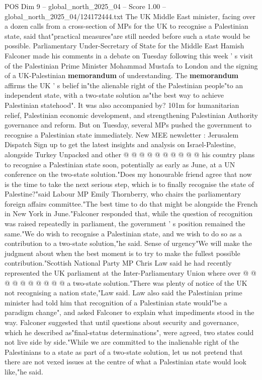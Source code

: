 \begin{textsample}{POS Dim 9 – global\_north\_2025\_04 – Score 1.00 – global\_north\_2025\_04/124172444.txt}  \label{ex:f9_pos_319}
The UK Middle East minister, facing over a dozen calls from a cross-section of MPs for the UK to recognise a Palestinian state, said that"practical measures"are still needed before such a state would be possible.
Parliamentary Under-Secretary of State for the Middle East Hamish Falconer made his comments in a debate on Tuesday following this week ' s visit of the Palestinian Prime Minister Mohammad Mustafa to London and the signing of a UK-Palestinian \textbf{memorandum} of understanding.
The \textbf{memorandum} affirms the UK ' s belief in"the alienable right of the Palestinian people"to an independent state, with a two-state solution as"the best way to achieve Palestinian statehood".
It was also accompanied by? 101m for humanitarian relief, Palestinian economic development, and strengthening Palestinian Authority governance and reform.
But on Tuesday, several MPs pushed the government to recognise a Palestinian state immediately.
New MEE newsletter : Jerusalem Dispatch Sign up to get the latest insights and analysis on Israel-Palestine, alongside Turkey Unpacked and other @ @ @ @ @ @ @ @ @ @ his country plans to recognise a Palestinian state soon, potentially as early as June, at a UN conference on the two-state solution."Does my honourable friend agree that now is the time to take the next serious step, which is to finally recognise the state of Palestine?"said Labour MP Emily Thornberry, who chairs the parliamentary foreign affairs committee."The best time to do that might be alongside the French in New York in June."Falconer responded that, while the question of recognition was raised repeatedly in parliament, the government ' s position remained the same."We do wish to recognise a Palestinian state, and we wish to do so as a contribution to a two-state solution,"he said.
Sense of urgency"We will make the judgment about when the best moment is to try to make the fullest possible contribution."Scottish National Party MP Chris Law said he had recently represented the UK parliament at the Inter-Parliamentary Union where over @ @ @ @ @ @ @ @ @ @ a two-state solution."There was plenty of notice of the UK not recognising a nation state,"Law said.
Law also said the Palestinian prime minister had told him that recognition of a Palestinian state would"be a paradigm change", and asked Falconer to explain what impediments stood in the way.
Falconer suggested that until questions about security and governance, which he described as"final-status determinations", were agreed, two states could not live side by side."While we are committed to the inalienable right of the Palestinians to a state as part of a two-state solution, let us not pretend that there are not vexed issues at the centre of what a Palestinian state would look like,"he said.

\end{textsample}
